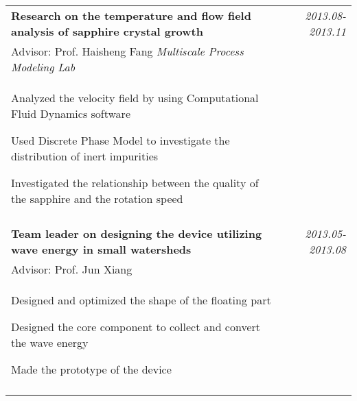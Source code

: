 \documentclass[a4paper,10pt]{article}
\begin{document}
\begin{tabular}{p{14.5cm}r}
\textbf{Research on the temperature and flow field analysis of sapphire crystal growth}  & \emph{2013.08-2013.11} \\
\hspace{1em} Advisor: Prof. Haisheng Fang \hspace{6.5em} \emph{Multiscale Process Modeling Lab}  & \vspace{-0.5em} \\
\begin{compactitem}
       \item Analyzed the velocity field by using Computational Fluid Dynamics software\vspace{0.2em}
       \item Used Discrete Phase Model to investigate the distribution of inert impurities\vspace{0.2em}
       \item Investigated the relationship between the quality of the sapphire and the rotation speed
     \end{compactitem}&\vspace{-2.2em} \\
\multicolumn{2}{c}{} \\
 \textbf{Team leader on designing the device utilizing wave energy in small watersheds}&  \emph{2013.05-2013.08} \\
\hspace{1em}  Advisor: Prof. Jun Xiang  & \vspace{-0.5em}\\
\begin{compactitem}
       \item Designed and optimized the shape of the floating part\vspace{0.2em}
       \item Designed the core component to collect and convert the wave energy\vspace{0.2em}
       \item Made the prototype of the device
     \end{compactitem}&\vspace{-1em} \\
\multicolumn{2}{c}{} \vspace{-1.5em} \\


\end{tabular}
\end{document}
